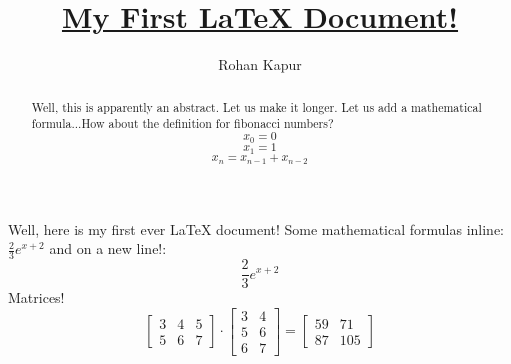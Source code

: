 \documentclass[letterpaper,12pt]{article}
\title{\underline{My First \LaTeX{} Document!}}
\author{Rohan Kapur}
\begin{document}
\maketitle
\begin{abstract}
  Well, this is apparently an abstract. Let us make it longer. Let us add a mathematical formula...How about the definition for fibonacci numbers?
  \[x_{0} = 0\]
  \[x_{1} = 1\]
  \[x_{n} = x_{n-1} + x_{n-2}\]
\end{abstract}
Well, here is my first ever LaTeX document! Some mathematical formulas inline: \(\frac{2}{3}e^{x+2}\) and on a new line!:
\[\frac{2}{3}e^{x+2}\]
Matrices!
\[
  \begin{bmatrix}
    3 & 4 & 5 \\
    5 & 6 & 7
  \end{bmatrix}
  \cdot
  \begin{bmatrix}
    3 & 4 \\
    5 & 6 \\
    6 & 7
  \end{bmatrix}
  =
  \begin{bmatrix}
    59 & 71  \\
    87 & 105
  \end{bmatrix}
\]
\end{document}
